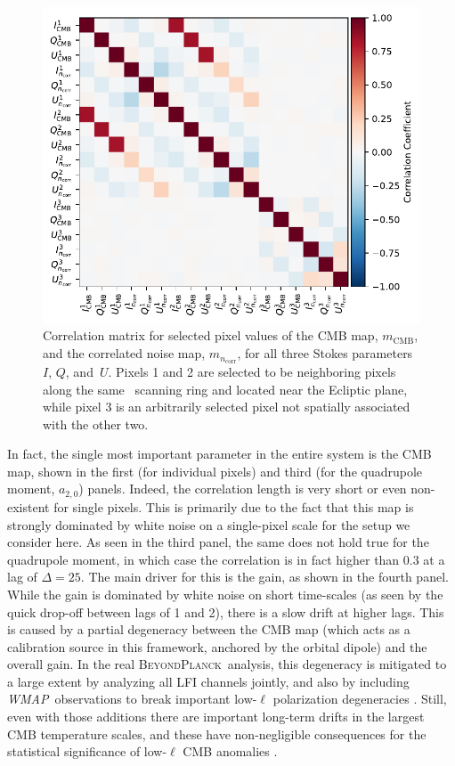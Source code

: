 \documentclass[twocolumn]{aa}%
\def\WMAP{\emph{WMAP}}
\newcommand{\BP}{\textsc{BeyondPlanck}}
\begin{document}
\begin{figure}[t]
    \begin{center}
        \includegraphics[width=\linewidth]{figs/map_pixel_corr.pdf}
    \end{center}
    \caption{Correlation matrix for selected pixel values of the CMB
      map, $m_\mathrm{CMB}$, and the correlated noise map,
      $m_{n_\mathrm{corr}}$, for all three Stokes parameters~$I$, $Q$, and~$U$. Pixels 1
      and 2 are selected to be neighboring pixels along the same
      \Planck\ scanning ring and located near the Ecliptic plane,
      while pixel 3 is an arbitrarily selected pixel not spatially
      associated with the other two.}
    \label{fig:pixel_corr}
\end{figure}


In fact, the single most important parameter in the entire system is
the CMB map, shown in the first (for individual pixels) and third (for
the quadrupole moment, $a_{2,0}$) panels. Indeed, the correlation 
length is very short or even non-existent for single pixels. This
is primarily due to the fact that this map is strongly dominated by
white noise on a single-pixel scale for the setup we consider here. As
seen in the third panel, the same does not hold true for the
quadrupole moment, in which case the correlation is in fact higher
than 0.3 at a lag of $\Delta=25$. The main driver for this is the
gain, as shown in the fourth panel. While the gain is dominated by
white noise on short time-scales (as seen by the quick drop-off
between lags of 1 and 2), there is a slow drift at higher lags. This
is caused by a partial degeneracy between the CMB map (which acts as a
calibration source in this framework, anchored by the orbital dipole)
and the overall gain. In the real \BP\ analysis, this degeneracy is
mitigated to a large extent by analyzing all LFI channels jointly, and
also by including \WMAP\ observations to break important low-$\ell$
polarization degeneracies \citep{bp07,bp10}. Still, even with those
additions there are important long-term drifts in the largest CMB
temperature scales, and these have non-negligible consequences for the
statistical significance of low-$\ell$ CMB anomalies \citep{bp11}.
\end{document}
